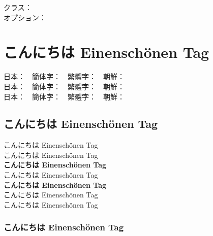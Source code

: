 \documentclass[a4paper,titlepage, draft]{\class}
\begin{document}
\parindent0mm
クラス：\texttt{\class}\\
オプション：\texttt{\option}

\section{   こんにちは Einenschönen Tag}

日本：　簡体字：　繁體字：　朝鮮：\\
日本：　簡体字：　繁體字：　朝鮮：\\
日本：　簡体字：　繁體字：　朝鮮：

\subsection{   こんにちは Einenschönen Tag}

\makeatletter\if@deluxe
{\mcfamily\ltseries
{}   %
こんにちは Einenschönen Tag\\
}%
\fi\makeatother
{\mcfamily
{}   %
こんにちは Einenschönen Tag\\
}%
{\mcfamily\bfseries
{}   %
こんにちは Einenschönen Tag\\
}%
{\gtfamily
{}   %
こんにちは Einenschönen Tag\\
}%
{\gtfamily\bfseries
{}   %
こんにちは Einenschönen Tag\\
}%
\makeatletter\if@deluxe
{\gtfamily\ebseries
{}   %
こんにちは Einenschönen Tag\\
}%
{\mgfamily
{}   %
こんにちは Einenschönen Tag\\
}%
\fi\makeatother

\subsubsection{   こんにちは Einenschönen Tag}
\end{document}
